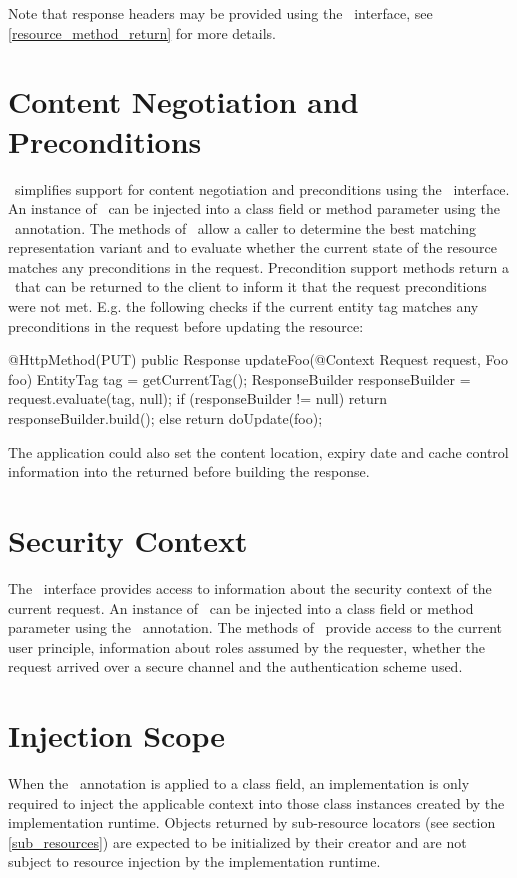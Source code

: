 Note that response headers may be provided using the \Response\ interface, see \ref{resource_method_return} for more details.

\section{Content Negotiation and Preconditions}

\jaxrs\ simplifies support for content negotiation and preconditions using the \Request\ interface. An instance of \Request\ can be injected into a class field or method parameter using the \Context\ annotation. The methods of \Request\ allow a caller to determine the best matching representation variant and to evaluate whether the current state of the resource matches any preconditions in the request. Precondition support methods return a \ResponseBuilder\ that can be returned to the client to inform it that the request preconditions were not met. E.g. the following checks if the current entity tag matches any preconditions in the request before updating the resource:

\begin{listing}{1}
@HttpMethod(PUT)
public Response updateFoo(@Context Request request, Foo foo) {
	EntityTag tag = getCurrentTag();
	ResponseBuilder responseBuilder = request.evaluate(tag, null);
	if (responseBuilder != null)
	  return responseBuilder.build();
	else
	  return doUpdate(foo);
}
\end{listing}


The application could also set the content location, expiry date and cache control information into the returned  before building the response.

\section{Security Context}

The \SecurityContext\ interface provides access to information about the security context of the current request. An instance of \SecurityContext\ can be injected into a class field or method parameter using the \Context\ annotation. The methods of \SecurityContext\ provide access to the current user principle, information about roles assumed by the requester, whether the request arrived over a secure channel and the authentication scheme used.

\section{Injection Scope}

When the \Context\ annotation is applied to a class field, an implementation is only required to inject the applicable context into those class instances created by the implementation runtime. Objects returned by sub-resource locators (see section \ref{sub_resources}) are expected to be initialized by their creator and are not subject to resource injection by the implementation runtime.

